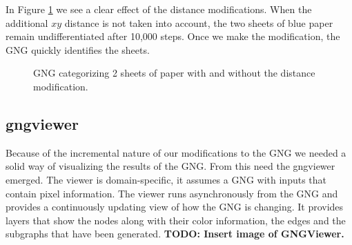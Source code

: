 \documentclass{article}
\renewcommand{\|}{\origbar} %
\begin{document}
In Figure \ref{fig:distModification} we see a clear effect of the distance modifications. When the additional $xy$ distance is not taken into account, the two sheets of blue paper remain undifferentiated after 10,000 steps. Once we make the modification, the GNG quickly identifies the sheets.

\begin{figure}[h!]
  \centering


  \caption{GNG categorizing 2 sheets of paper with and without the distance modification.}
  \label{fig:distModification}
\end{figure}

\subsection{gngviewer}

Because of the incremental nature of our modifications to the GNG we needed a solid way of visualizing the results of the GNG. From this need the gngviewer emerged. The viewer is domain-specific, it assumes a GNG with inputs that contain pixel information. The viewer runs asynchronously from the GNG and provides a continuously updating view of how the GNG is changing. It provides layers that show the nodes along with their color information, the edges and the subgraphs that have been generated. {\bf TODO: Insert image of GNGViewer.}
\end{document}

